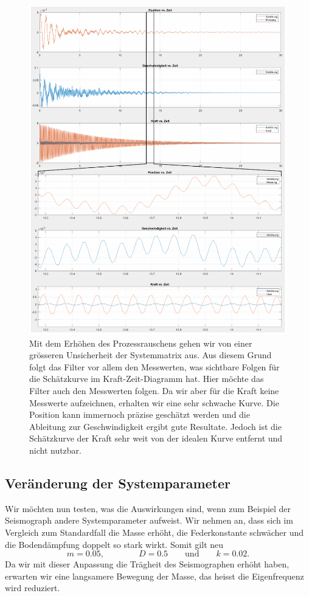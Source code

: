 \begin{figure}
  \begin{center}
    \includegraphics[width=.95\linewidth,keepaspectratio]{papers/erdbeben/images/Prozessrauschen_geaendert.PDF}
    \caption{
      Mit dem Erhöhen des Prozessrauschens gehen wir von einer grösseren Unsicherheit der Systemmatrix aus.
      Aus diesem Grund folgt das Filter vor allem den Messwerten,
      was sichtbare Folgen für die Schätzkurve im Kraft-Zeit-Diagramm hat.
      Hier möchte das Filter auch den Messwerten folgen.
      Da wir aber für die Kraft keine Messwerte aufzeichnen,
      erhalten wir eine sehr schwache Kurve.
      Die Position kann immernoch präzise geschätzt werden und die Ableitung zur Geschwindigkeit ergibt gute Resultate.
      Jedoch ist die Schätzkurve der Kraft sehr weit von der idealen Kurve entfernt und nicht nutzbar.
    }
    \label{erdbeben:fig:prozessrauschen-geaendert}
  \end{center}
\end{figure}

\subsection{Veränderung der Systemparameter}
Wir möchten nun testen, was die Auswirkungen sind, wenn zum Beispiel der Seismograph andere Systemparameter aufweist.
Wir nehmen an, dass sich im Vergleich zum Standardfall die Masse erhöht, die Federkonstante schwächer und die Bodendämpfung doppelt so stark wirkt.
Somit gilt neu
\[
m = 0.05,
\qquad \qquad
D = 0.5
\qquad \text{und} \qquad
k = 0.02.
\]
Da wir mit dieser Anpassung die Trägheit des Seismographen erhöht haben,
erwarten wir eine langsamere Bewegung der Masse, das heisst die Eigenfrequenz wird reduziert.



